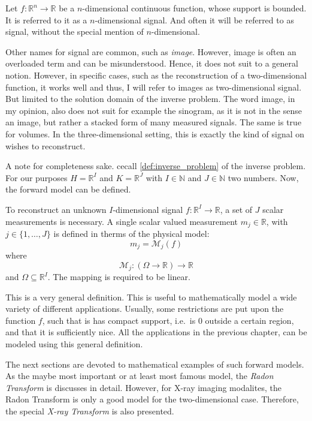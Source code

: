 \begin{definition}[Signal]\label{def:signal}
	Let \(f\colon \mathbb{R}^n \to \mathbb{R}\) be a \(n\)-dimensional continuous function,
	whose support is bounded. It is referred to it as a \(n\)-dimensional signal. And often it
	will be referred to as signal, without the special mention of \(n\)-dimensional.
\end{definition}

Other names for signal are common, such as \textit{image}. However, image is often an overloaded
term and can be misunderstood. Hence, it does not suit to a general notion. However, in specific
cases, such as the reconstruction of a two-dimensional function, it works well and thus, I will
refer to images as two-dimensional signal. But limited to the solution domain of the inverse
problem. The word image, in my opinion, also does not suit for example the sinogram, as it is not in
the sense an image, but rather a stacked form of many measured signals. The same is true for
volumes. In the three-dimensional setting, this is exactly the kind of signal on wishes to
reconstruct.

A note for completeness sake. cecall \autoref{def:inverse_problem} of the inverse problem. For our
purposes \(H = \mathbb{R}^I\) and \(K = \mathbb{R}^J\) with \(I \in \mathbb{N}\) and \(J \in
\mathbb{N}\) two numbers. Now, the forward model can be defined.

\begin{definition}\label{def:forward-model}
	To reconstruct an unknown \(I\)-dimensional signal \(f: \mathbb{R}^I \to \mathbb{R}\), a set
	of \(J\) scalar measurements is necessary. A single scalar valued measurement \(m_j \in
	\mathbb{R}\), with \(j \in \{1, \dots, J\}\) is defined in therms of the physical model:
	\[ m_j = \mathscr{M}_j(f)\]
	where
	\[ \mathscr{M}_j\colon (\Omega \to \mathbb{R}) \to \mathbb{R} \]
	and \(\Omega \subseteq \mathbb{R}^I\). The mapping is required to be linear.
\end{definition}

This is a very general definition. This is useful to mathematically model a wide variety of
different applications. Usually, some restrictions are put upon the function \(f\), such that is has
compact support, i.e.\ is \(0\) outside a certain region, and that it is sufficiently nice. All the
applications in the previous chapter, can be modeled using this general definition.

The next sections are devoted to mathematical examples of such forward models. As the maybe most
important or at least most famous model, the \textit{Radon Transform} is discusses in detail.
However, for X-ray imaging modalites, the Radon Transform is only a good model for the
two-dimensional case. Therefore, the special \textit{X-ray Transform} is also presented.

